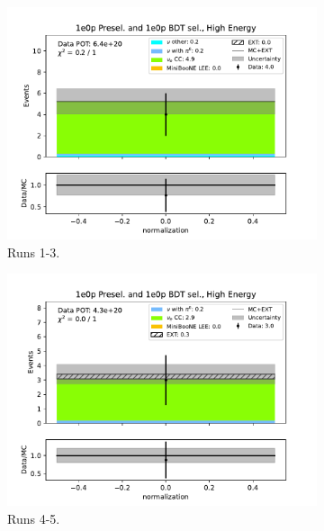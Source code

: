 \begin{figure}[H]
    \centering
    \begin{subfigure}{0.33\linewidth}
        \includegraphics[width=\linewidth]{technote/Sidebands/Figures/FarSideband/far_sideband_dummy_run123_ZP_ZPBDT_HIGH_ENERGY.pdf}
    \caption{Runs 1-3.}
    \end{subfigure}%
    \begin{subfigure}{0.33\linewidth}
        \includegraphics[width=\linewidth]{technote/Sidebands/Figures/FarSideband/far_sideband_dummy_run4b4c4d5_ZP_ZPBDT_HIGH_ENERGY.pdf}
    \caption{Runs 4-5.}
    \end{subfigure}
    \begin{subfigure}{0.33\linewidth}

\end{subfigure}
\end{figure}
